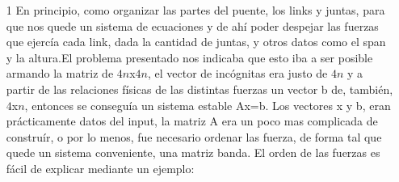 \begin{itemize}
\item[1] En principio, como organizar las partes del puente, los links y juntas, para que nos quede un sistema de ecuaciones y de ah\'i poder despejar las fuerzas que ejerc\'ia cada link, dada la cantidad de juntas, y otros datos como el span y la altura.El problema presentado nos indicaba que esto iba a ser posible armando la matriz de $4n$x$4n$, el vector de inc\'ognitas era justo de $4n$ y a partir de las relaciones f\'isicas de las distintas fuerzas un vector b de, tambi\'en, $4$x$n$, entonces se consegu\'ia un sistema estable Ax=b.\newline
Los vectores x y b, eran pr\'acticamente datos del input, la matriz A era un poco mas complicada de construír, o por lo menos, fue necesario ordenar las fuerza, de forma tal que quede un sistema conveniente, una matriz banda. El orden de las fuerzas es f\'acil de explicar mediante un ejemplo:\newline

\begin{figure}[!ht]
\begin{center}
\end{center}
\end{figure}
\end{itemize}

